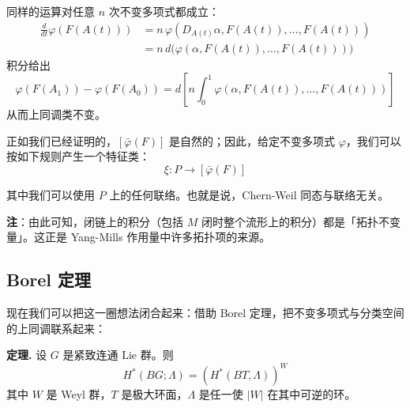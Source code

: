 
同样的运算对任意 $n$ 次不变多项式都成立：
\begin{equation}
\begin{aligned}
  \frac{d}{dt}\varphi(F(A(t)))
  &= n\,\varphi(D_{A(t)}\alpha,F(A(t)),\dots,F(A(t)))\\
  &= n\,d\Big(\varphi(\alpha,F(A(t)),\dots,F(A(t)))\Big)
\end{aligned}
  \tag{I.22}
  \label{eq:I.22}
\end{equation}
积分给出
\begin{equation}
  \varphi(F(A_1))-\varphi(F(A_0))
  = d\left[n\int_0^1\varphi(\alpha,F(A(t)),\dots,F(A(t)))\right]
  \tag{I.23}
  \label{eq:I.23}
\end{equation}
从而上同调类不变。

正如我们已经证明的，$[\bar\varphi(F)]$ 是自然的；因此，给定不变多项式 $\varphi$，我们可以按如下规则产生一个特征类：
\begin{equation}
  \xi: P\to[\bar\varphi(F)]
  \tag{I.24}
  \label{eq:I.24}
\end{equation}

其中我们可以使用 $P$ 上的任何联络。也就是说，Chern-Weil 同态与联络无关。

\textbf{注}：由此可知，闭链上的积分（包括 $M$ 闭时整个流形上的积分）都是「拓扑不变量」。这正是 Yang-Mills 作用量中许多拓扑项的来源。

\subsection{Borel 定理} %

现在我们可以把这一圈想法闭合起来：借助 Borel 定理，把不变多项式与分类空间的上同调联系起来：

\textbf{定理.} 设 $G$ 是紧致连通 Lie 群。则
\begin{equation}
  H^*(BG;\Lambda) = \left(H^*(BT,\Lambda)\right)^W
  \tag{I.25}
  \label{eq:I.25}
\end{equation}
其中 $W$ 是 Weyl 群，$T$ 是极大环面，$\Lambda$ 是任一使 $|W|$ 在其中可逆的环。

